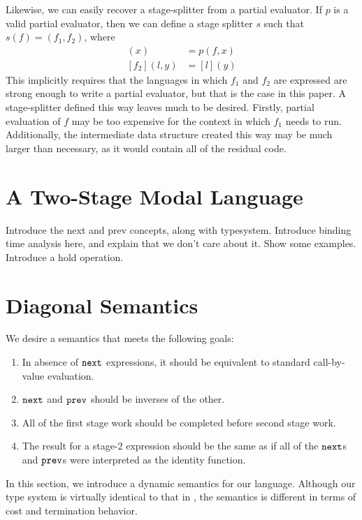 \documentclass{sigplanconf}
\begin{document}
Likewise, we can easily recover a stage-splitter from a partial evaluator.  If $p$ is a valid partial evaluator, then we can define a stage splitter $s$ such that $s(f)=(f_1,f_2)$, where
\begin{align*}
[f_1](x) &= p (f,x) \\
[f_2](l,y) &= [l] (y)
\end{align*}
This implicitly requires that the languages in which $f_1$ and $f_2$ are expressed are strong enough to write a partial evaluator, but that is the case in this paper.  A stage-splitter defined this way leaves much to be desired.  Firstly, partial evaluation of $f$ may be too expensive for the context in which $f_1$ needs to run.  Additionally, the intermediate data structure created this way may be much larger than necessary, as it would contain all of the residual code.

\section{A Two-Stage Modal Language}

Introduce the next and prev concepts, along with typesystem.  Introduce binding time analysis here, and explain that we don't care about it.  Show some examples.  Introduce a hold operation.

\section{Diagonal Semantics}

We desire a semantics that meets the following goals:

\begin{enumerate}
\item In absence of ${\tt next}$ expressions, it should be equivalent to standard call-by-value evaluation.
\item ${\tt next}$ and ${\tt prev}$ should be inverses of the other.
\item All of the first stage work should be completed before second stage work.
\item The result for a stage-2 expression should be the same as if all of the ${\tt next}$s and ${\tt prev}$s were interpreted as the identity function.
\end{enumerate}

In this section, we introduce a dynamic semantics for our language.  Although our type system is virtually identical to that in \cite{davies96}, the semantics is different in terms of cost and termination behavior. 
\end{document}
